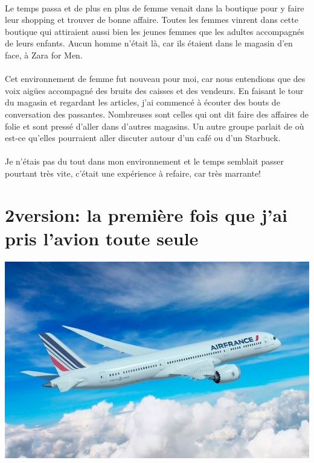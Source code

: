 \paragraph{} Le temps passa et de plus en plus de femme venait dans la boutique
pour y faire leur shopping et trouver de bonne affaire. Toutes les femmes
vinrent dans cette boutique qui attiraient aussi bien les jeunes femmes que les
adultes accompagnés de leurs enfants. Aucun homme n'était là, car ils étaient
dans le magasin d'en face, à Zara for Men.

\paragraph{} Cet environnement de femme fut nouveau pour moi, car nous
entendions que des voix aigües accompagné des bruits des caisses et des
vendeurs. En faisant le tour du magasin et regardant les articles, j'ai
commencé à écouter des bouts de conversation des passantes.  Nombreuses sont
celles qui ont dit faire des affaires de folie et sont pressé d'aller dans
d'autres magasins. Un autre groupe parlait de où est-ce qu'elles pourraient
aller discuter autour d'un café ou d'un Starbuck.

\paragraph{} Je n'étais pas du tout dans mon environnement et le temps semblait
passer pourtant très vite, c'était une expérience à refaire, car très marrante!

\section[2\ieme version: l'avion]{2\ieme version: la première fois que j'ai pris l'avion toute seule}

\begin{center}
	\includegraphics[scale=0.6]{avion.jpg}
\end{center}

